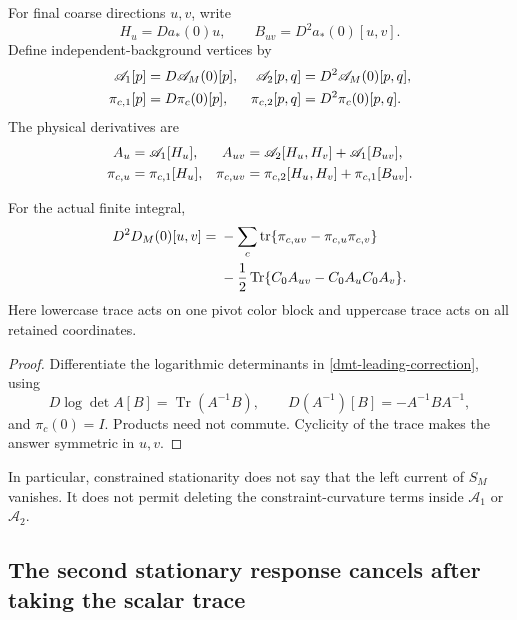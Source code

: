 For final coarse directions \(u,v\), write
\begin{equation}
 H_u=Da_*(0)u,\qquad B_{uv}=D^2a_*(0)[u,v].
 \label{dmt-stationary-responses}
\end{equation}
Define independent-background vertices by
\begin{align}
 \mathscr A_1[p]&=D\mathscr A_M(0)[p],&
 \mathscr A_2[p,q]&=D^2\mathscr A_M(0)[p,q],\notag\\
 \pi_{c,1}[p]&=D\pi_c(0)[p],&
 \pi_{c,2}[p,q]&=D^2\pi_c(0)[p,q].
 \label{dmt-background-vertices}
\end{align}
The physical derivatives are
\begin{align}
 A_u&=\mathscr A_1[H_u],&
 A_{uv}&=\mathscr A_2[H_u,H_v]+\mathscr A_1[B_{uv}],\notag\\
 \pi_{c,u}&=\pi_{c,1}[H_u],&
 \pi_{c,uv}&=\pi_{c,2}[H_u,H_v]+\pi_{c,1}[B_{uv}].
 \label{dmt-full-composition}
\end{align}

\begin{proposition}
\label{dmt-finite-hessian}
For the actual finite integral,
\begin{align}
 D^2D_M(0)[u,v]
 ={}&-\sum_c\operatorname{tr}
       \{\pi_{c,uv}-\pi_{c,u}\pi_{c,v}\}\notag\\
 &-\frac12\operatorname{Tr}
       \{C_0A_{uv}-C_0A_uC_0A_v\}.
 \label{dmt-full-hessian}
\end{align}
Here lowercase trace acts on one pivot color block and
uppercase trace acts on all retained coordinates.
\end{proposition}
\begin{proof}
Differentiate the logarithmic determinants in
\eqref{dmt-leading-correction}, using
\[
 D\log\det A[B]=\operatorname{Tr}(A^{-1}B),
 \qquad D(A^{-1})[B]=-A^{-1}BA^{-1},
\]
and \(\pi_c(0)=I\). Products need not commute. Cyclicity of
the trace makes the answer symmetric in \(u,v\).
\end{proof}

In particular, constrained stationarity does not say that
the left current of \(S_M\) vanishes. It does not permit
deleting the constraint-curvature terms inside
\(\mathscr A_1\) or \(\mathscr A_2\).

\subsection{The second stationary response cancels after taking the scalar trace}
\label{dmt-color-section}


